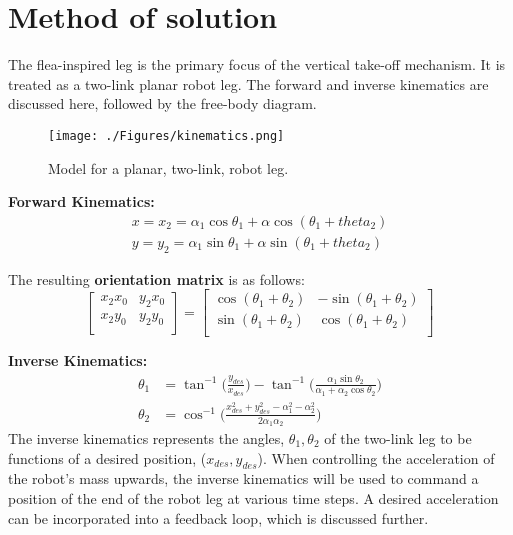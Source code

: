 \section{Method of solution}
\label{method}
\indent The flea-inspired leg is the primary focus of the vertical take-off mechanism. It is treated as a two-link planar robot leg. The forward and inverse kinematics are discussed here, followed by the free-body diagram.\\

\begin{figure}[H]
\begin{center}
\texttt{[image: ./Figures/kinematics.png]}
\caption{Model for a planar, two-link, robot leg.}
\label{fig:kinemaitcs}
\end{center}
\end{figure}


\textbf{Forward Kinematics:}
\begin{align}
	x = x_2 = \alpha_1\cos\theta_1 + \alpha\cos(\theta_1 + theta_2)\\
	y = y_2 = \alpha_1\sin\theta_1 + \alpha\sin(\theta_1 + theta_2)
\end{align}

\indent The resulting \textbf{orientation matrix} is as follows:
\begin{equation}
	\begin{bmatrix}
		x_2x_0 & y_2x_0\\
		x_2y_0 & y_2y_0\\
	\end{bmatrix}
	= 
	\begin{bmatrix}
		\cos(\theta_1 + \theta_2) & -\sin(\theta_1 + \theta_2)\\
		\sin(\theta_1 + \theta_2) & \cos(\theta_1 + \theta_2)\\
	\end{bmatrix}
\end{equation}

\textbf{Inverse Kinematics:}
\begin{align}
	\theta_1 & = \tan^{-1}\bigg(\frac{y_{des}}{x_{des}}\bigg)-\tan^{-1}\bigg(\frac{\alpha_1\sin\theta_2}{\alpha_1+\alpha_2\cos\theta_2}\bigg)\\
	\theta_2 &= \cos^{-1}\bigg(\frac{x_{des}^2 + y_{des}^2 - \alpha_1^2 - \alpha_2^2}{2\alpha_1\alpha_2}\bigg)
\end{align}
\indent The inverse kinematics represents the angles, $\theta_1, \theta_2$ of the two-link leg to be functions of a desired position, ($x_{des}, y_{des}$). When controlling the acceleration of the robot's mass upwards, the inverse kinematics will be used to command a position of the end of the robot leg at various time steps. A desired acceleration can be incorporated into a feedback loop, which is discussed further.\\

